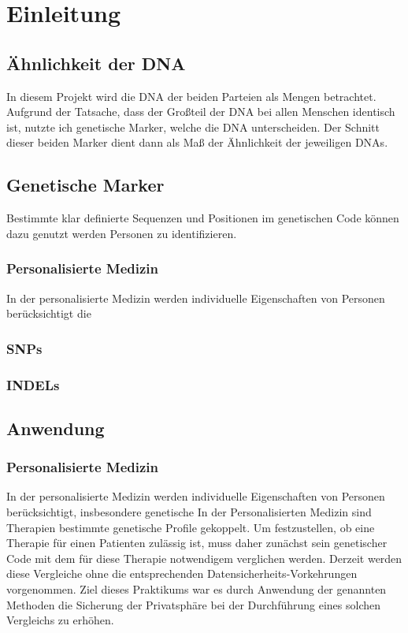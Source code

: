 \chapter{Einleitung}
\label{sec:Chapter1}


\section{Ähnlichkeit der DNA}
In diesem Projekt wird die DNA der beiden Parteien als Mengen betrachtet.
Aufgrund der Tatsache, dass der Großteil der DNA bei allen Menschen identisch ist, nutzte ich genetische Marker, welche die DNA unterscheiden.
Der Schnitt dieser beiden Marker dient  dann als Maß der Ähnlichkeit  der jeweiligen DNAs.
\section{Genetische Marker}
Bestimmte klar definierte Sequenzen und Positionen im genetischen Code können dazu genutzt werden Personen zu identifizieren.

\subsection{Personalisierte Medizin}
In der personalisierte Medizin werden individuelle Eigenschaften von Personen berücksichtigt die  

\subsection{SNPs}

\subsection{INDELs}

\section{Anwendung}

\subsection{Personalisierte Medizin}
In der personalisierte Medizin werden individuelle Eigenschaften von Personen berücksichtigt, insbesondere genetische 
In der Personalisierten Medizin sind  Therapien bestimmte genetische Profile  gekoppelt.
Um festzustellen, ob eine Therapie für einen Patienten zulässig ist, muss daher zunächst sein genetischer Code mit dem für diese Therapie notwendigem verglichen werden.
Derzeit werden diese Vergleiche ohne die entsprechenden Datensicherheits-Vorkehrungen vorgenommen.
Ziel dieses Praktikums war es durch Anwendung der genannten Methoden die Sicherung der Privatsphäre bei der Durchführung eines solchen Vergleichs zu erhöhen.

